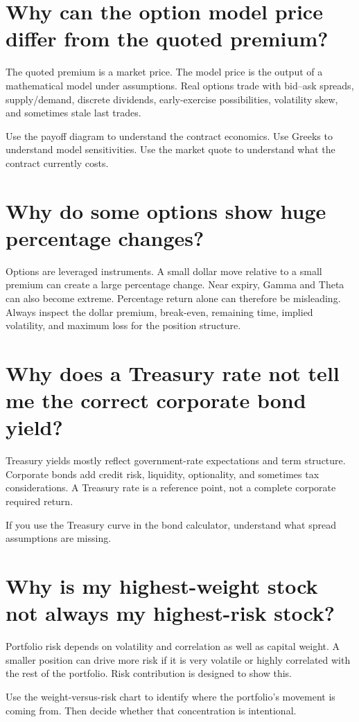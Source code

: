 \documentclass[11pt]{article}
\begin{document}
\section{Why can the option model price differ from the quoted premium?}
The quoted premium is a market price. The model price is the output of a mathematical model under assumptions. Real options trade with bid--ask spreads, supply/demand, discrete dividends, early-exercise possibilities, volatility skew, and sometimes stale last trades.

Use the payoff diagram to understand the contract economics. Use Greeks to understand model sensitivities. Use the market quote to understand what the contract currently costs.

\section{Why do some options show huge percentage changes?}
Options are leveraged instruments. A small dollar move relative to a small premium can create a large percentage change. Near expiry, Gamma and Theta can also become extreme. Percentage return alone can therefore be misleading. Always inspect the dollar premium, break-even, remaining time, implied volatility, and maximum loss for the position structure.

\section{Why does a Treasury rate not tell me the correct corporate bond yield?}
Treasury yields mostly reflect government-rate expectations and term structure. Corporate bonds add credit risk, liquidity, optionality, and sometimes tax considerations. A Treasury rate is a reference point, not a complete corporate required return.

If you use the Treasury curve in the bond calculator, understand what spread assumptions are missing.

\section{Why is my highest-weight stock not always my highest-risk stock?}
Portfolio risk depends on volatility and correlation as well as capital weight. A smaller position can drive more risk if it is very volatile or highly correlated with the rest of the portfolio. Risk contribution is designed to show this.

Use the weight-versus-risk chart to identify where the portfolio's movement is coming from. Then decide whether that concentration is intentional.
\end{document}
